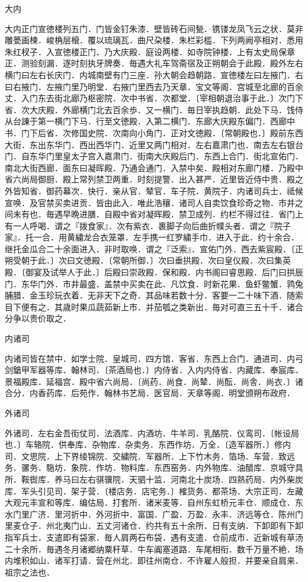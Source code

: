 \documentclass[]{article}
\begin{document}
大内

大内正门宣徳楼列五门．门皆金钉朱漆．壁皆砖石间甃．镌镂龙凤飞云之状．莫非雕甍画楝．峻桷层榱．覆以琉璃瓦．曲尺朶楼．朱栏彩槛．下列两阙亭相对．悉用朱红杈子．入宣徳楼正门．乃大庆殿．庭设两楼．如寺院钟楼．上有太史局保章正．测验刻漏．逐时刻执牙牌奏．毎遇大礼车驾斋宿及正朔朝会于此殿．殿外左右横门曰左右长庆门．内城南壁有门三座．孙大朝会趋朝路．宣徳楼左曰左掖门．右曰右掖门．左掖门里乃明堂．右掖门里西去乃天章．宝文等阁．宫城至北廊的百余丈．入门东去街北廊乃枢密院．次中书省．次都堂．〔宰相朝退治事于此．〕次门下省．次大庆殿．外廊横门北去百余歩．又一横门．毎日宰执趋朝．此处下马．饯侍从台諌于第一横门下马．行至文徳殿．入第二横门．东廊大庆殿东偏门．西廊中书．门下后省．次修国史院．次南向小角门．正对文徳殿．〔常朝殿也．〕殿前东西大街．东出东华门．西出西华门．近里又两门相对．左右嘉肃门也．南去左右银台门．自东华门里皇太子宫入嘉肃门．街南大庆殿后门．东西上合门．街北宣佑门．南北大街西廊．面东曰凝晖殿．乃通会通门．入禁中矣．殿相对东廊门楼．乃殿中省六尚局御厨．殿上常列禁卫两重．时刻提警．出入甚严．近里皆近侍中贵．殿之外皆知省．御药幕次．快行．亲从官．辇官．车子院．黄院子．内诸司兵士．祗候宣唤．及官禁买卖进贡．皆由此入．唯此浩穰．诸司人自卖饮食珍奇之物．市井之间未有也．毎遇早晩进膳．自殿中省对凝晖殿．禁卫成列．约栏不得过往．省门上有一人呼喝．谓之『拨食家』．次有紫衣．裹脚子向后曲折幞头者．谓之『院子家』．托一合．用黄繍龙合衣笼罩．左手携一红罗繍手巾．进入于此．约十余合．继托金瓜合二十余面进入．非时取唤．谓之『泛索』．宣佑门外．西去紫宸殿．〔正朔受朝于此．〕次曰文徳殿．〔常朝所御．〕次曰垂拱殿．次曰皇仪殿．次曰集英殿．〔御宴及试举人于此．〕后殿曰崇政殿．保和殿．内书阁曰睿思殿．后门曰拱辰门．东华门外．市井最盛．盖禁中买卖在此．凡饮食．时新花果．鱼虾鳖蟹．鹑兔脯腊．金玉珍玩衣着．无非天下之奇．其品味若数十分．客要一二十味下酒．随索目下便有之．其歳时果瓜蔬茹新上市．并茄瓠之类新出．毎对可直三五十千．诸合分争以贵价取之．

内诸司

内诸司皆在禁中．如学士院．皇城司．四方馆．客省．东西上合门．通进司．内弓剑鎗甲军器等库．翰林司．〔茶酒局也．〕内侍省．入内内侍省．内藏库．奉宸库．景福殿库．延福宫．殿中省六尚局．〔尚药．尚食．尚辇．尚酝．尚舎．尚衣．〕诸合分．内香药库．后苑作．翰林书艺局．医官局．天章等阁．明堂颁朔布政府．

外诸司

外诸司．左右金吾街仗司．法酒库．内酒坊．牛羊司．乳酪院．仪鸾司．〔帐设局也．〕车辂院．供奉库．杂物库．杂卖务．东西作坊．万全．〔造军器所．〕修内司．文思院．上下界绫锦院．交繍院．军器所．上下竹木务．箔场．车营．致远务．骡务．駞坊．象院．作坊．物料库．东西窑务．内外物库．油醋库．京城守具所．鞍辔库．养马曰左右骐骥院．天驷十监．河南北十炭场．四熟药局．内外柴炭库．军头引见司．架子营．〔楼店务．店宅务．〕榷货务．都茶场．大宗正司．左藏大观元丰宣和等库．编估局．打套所．诸米麦等．自州东虹桥元丰仓．顺成仓．东水门里广济．里河折中．外河折中．富国．广盈．万盈．永丰．济远等仓．陈州门里麦仓子．州北夷门山．五丈河诸仓．约共有五十余所．日有支纳．下卸即有下卸指军兵士．支遣即有袋家．毎人肩两石布袋．遇有支遣．仓前成市．近新城有草汤二十余所．毎遇冬月诸郷纳粟秆草．牛车阗塞道路．车尾相衔．数千万量不絶．场内堆积如山．诸军打请．营在州北．即往州南仓．不许雇人般担．并要亲自肩来．祖宗之法也．
\end{document}
